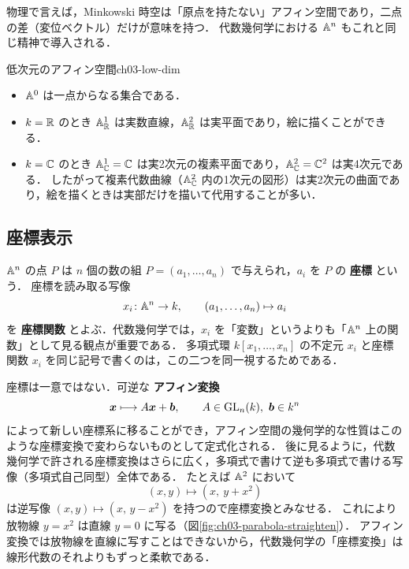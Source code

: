 物理で言えば，Minkowski 時空は「原点を持たない」アフィン空間であり，二点の差（変位ベクトル）だけが意味を持つ．
代数幾何学における $\mathbb{A}^n$ もこれと同じ精神で導入される．

\begin{myex}{低次元のアフィン空間}{ch03-low-dim}
\begin{itemize}
  \item $\mathbb{A}^0$ は一点からなる集合である．
  \item $k=\mathbb{R}$ のとき $\mathbb{A}^1_{\mathbb{R}}$ は実数直線，$\mathbb{A}^2_{\mathbb{R}}$ は実平面であり，絵に描くことができる．
  \item $k=\mathbb{C}$ のとき $\mathbb{A}^1_{\mathbb{C}}=\mathbb{C}$ は実2次元の複素平面であり，$\mathbb{A}^2_{\mathbb{C}}=\mathbb{C}^2$ は実4次元である．
        したがって複素代数曲線（$\mathbb{A}^2_{\mathbb{C}}$ 内の1次元の図形）は実2次元の曲面であり，絵を描くときは実部だけを描いて代用することが多い．
\end{itemize}
\end{myex}

\subsection{座標表示}

$\mathbb{A}^n$ の点 $P$ は $n$ 個の数の組 $P=(a_1,\dots,a_n)$ で与えられ，$a_i$ を $P$ の \textbf{座標} という．
座標を読み取る写像
\[
  x_i \colon \mathbb{A}^n \to k,\qquad (a_1,\dots,a_n)\mapsto a_i
\]
を \textbf{座標関数} とよぶ．代数幾何学では，$x_i$ を「変数」というよりも「$\mathbb{A}^n$ 上の関数」として見る観点が重要である．
多項式環 $k[x_1,\dots,x_n]$ の不定元 $x_i$ と座標関数 $x_i$ を同じ記号で書くのは，この二つを同一視するためである．

座標は一意ではない．可逆な \textbf{アフィン変換}
\[
  \bm{x} \longmapsto A\bm{x}+\bm{b},\qquad A\in\operatorname{GL}_n(k),\ \bm{b}\in k^n
\]
によって新しい座標系に移ることができ，アフィン空間の幾何学的な性質はこのような座標変換で変わらないものとして定式化される．
後に見るように，代数幾何学で許される座標変換はさらに広く，多項式で書けて逆も多項式で書ける写像（多項式自己同型）全体である．
たとえば $\mathbb{A}^2$ において
\[
  (x,y)\longmapsto (x,\ y+x^2)
\]
は逆写像 $(x,y)\mapsto (x,\,y-x^2)$ を持つので座標変換とみなせる．
これにより放物線 $y=x^2$ は直線 $y=0$ に写る（図\ref{fig:ch03-parabola-straighten}）．
アフィン変換では放物線を直線に写すことはできないから，代数幾何学の「座標変換」は線形代数のそれよりもずっと柔軟である．

